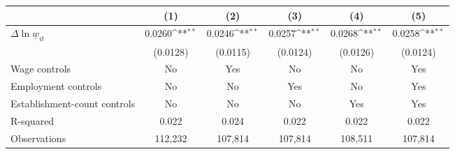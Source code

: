 {
\def\sym#1{\ifmmode^{#1}\else\(^{#1}\)\fi}
\begin{tabular}{l*{5}{c}}
\hline\hline
          &\multicolumn{1}{c}{(1)}         &\multicolumn{1}{c}{(2)}         &\multicolumn{1}{c}{(3)}         &\multicolumn{1}{c}{(4)}         &\multicolumn{1}{c}{(5)}         \\
\hline
$\Delta \ln \underline{w}_{it}$&   0.0260\sym{**} &   0.0246\sym{**} &   0.0257\sym{**} &   0.0268\sym{**} &   0.0258\sym{**} \\
          & (0.0128)         & (0.0115)         & (0.0124)         & (0.0126)         & (0.0124)         \\
\hline
Wage controls&       No         &      Yes         &       No         &       No         &      Yes         \\
Employment controls&       No         &       No         &      Yes         &       No         &      Yes         \\
Establishment-count controls&       No         &       No         &       No         &      Yes         &      Yes         \\
R-squared &    0.022         &    0.024         &    0.022         &    0.022         &    0.022         \\
Observations&  112,232         &  107,814         &  107,814         &  108,511         &  107,814         \\
\hline\hline
\end{tabular}
}
